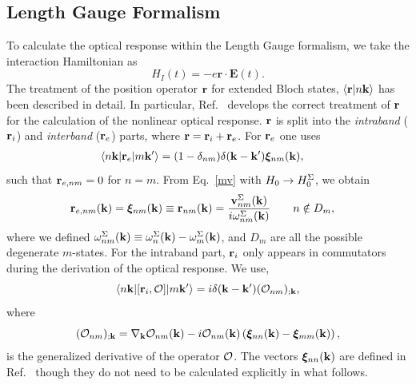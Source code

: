 \documentclass[floatfix,prb,aps,superscriptaddress,showpacs,11pt,preprint,letterpaper]{revtex4}
\begin{document}
\subsection{Length Gauge Formalism}
To calculate the optical response 
within the Length Gauge formalism, we take the 
interaction Hamiltonian as
\begin{equation}
H_{I}(t)=-e\mathbf{r}\cdot \mathbf{E}(t).  \label{rde}
\end{equation}
The 
treatment of the position operator
$\mathbf{r}$ for extended Bloch states, $\langle {\mathbf{r}} | {n\mathbf{k}} \rangle$ has 
been described in detail.\cite{adamsJCP53,blountSSP62} 
In particular, Ref.~ develops
the correct treatment of $\mathbf{r}$ for
the calculation of the nonlinear optical response.
$\mathbf{r}$ is split into the {\it intraband} 
($\mathbf{r}_i$) and {\it interband} ($\mathbf{r}_e$) parts, where 
$\mathbf{r}=\mathbf{r}_i+\mathbf{r}_e$. 
For $\mathbf{r}_e$ one uses
\begin{align}\label{rnminn}
\langle n\mathbf{k} |\mathbf{r}_e| m\mathbf{k}' \rangle &=
(1-\delta_{nm})\delta(\mathbf{k}-\mathbf{k}')\boldsymbol{\xi}_{nm}(\mathbf{k}) 
,
\end{align}
such that $\mathbf{r}_{e,nm}=0$ for $n=m$.
From Eq.~\eqref{mv} with $H_0\to
H^\Sigma_0$, we obtain
\begin{align}\label{pmnrmn}
\mathbf{r}_{e,nm}(\mathbf{k}) =
\boldsymbol{\xi}_{nm}(\mathbf{k})\equiv 
\mathbf{r}_{nm}(\mathbf{k}) 
&=
\frac{\mathbf{v}^\Sigma_{nm}(\mathbf{k})}{i\omega^\Sigma_{nm}(\mathbf{k})}
\quad\quad n\notin D_m 
,
\end{align}  
where we defined
$\omega^\Sigma_{nm}(\mathbf{k})\equiv\omega^\Sigma_n(\mathbf{k})-\omega^\Sigma_m(\mathbf{k})$, and
$D_m$ are all the possible degenerate $m$-states. 
For the intraband part, $\mathbf{r}_i$ only appears in
commutators during the derivation of
the optical response. We use,\cite{aversaPRB95}
\begin{equation}\label{conmri3n}
\langle n\mathbf{k} |[\mathbf{r}_i,{\cal O}]| m\mathbf{k}' \rangle
=i\delta(\mathbf{k}-\mathbf{k}')({\cal O}_{nm})_{;\mathbf{k}}
,
\end{equation}  
where
\begin{equation}\label{gendevnn}
({\cal O}_{nm})_{;\mathbf{k}}=
\nabla_{\mathbf{k}} 
{\cal O}_{n m}(\mathbf{k}) 
- 
i 
{\cal O}_{nm}(\mathbf{k}) 
\left(
\boldsymbol{\xi}_{nn}(\mathbf{k}) 
-
\boldsymbol{\xi}_{mm}(\mathbf{k}) 
\right) 
,
\end{equation} 
is
the generalized derivative 
of the operator ${\cal O}$. 
The vectors $\boldsymbol{\xi}_{nn}(\mathbf{k})$ are defined in 
Ref.~ though they do not need to be 
calculated explicitly in what follows. 
\end{document}
